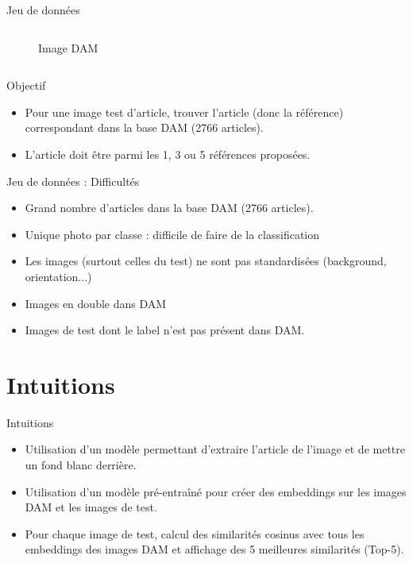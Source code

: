 \documentclass{beamer}
\begin{document}
\begin{frame}{Jeu de données}
\begin{columns}
\begin{figure}
        \caption{Image DAM}
    \end{figure}
\end{columns}
\vspace{0.5cm}
\begin{block}{Objectif}
\begin{itemize}
    \item Pour une image test d'article, trouver l'article (donc la référence) correspondant dans la base DAM (2766 articles).
    \item L'article doit être parmi les 1, 3 ou 5 références proposées.
\end{itemize}
\end{block}
\end{frame}

\begin{frame}{Jeu de données : Difficultés}
\begin{itemize}
    \item Grand nombre d'articles dans la base DAM (2766 articles).
    \item Unique photo par classe : difficile de faire de la classification
    \item Les images (surtout celles du test) ne sont pas standardisées (background, orientation...)
    \item Images en double dans DAM
    \item Images de test dont le label n'est pas présent dans DAM.
\end{itemize}
\end{frame}


\section{Intuitions}
\begin{frame}{Intuitions}
\begin{itemize}
    \item Utilisation d'un modèle permettant d'extraire l'article de l'image et de mettre un fond blanc derrière.
    \item Utilisation d'un modèle pré-entraîné pour créer des embeddings sur les images DAM et les images de test.
    \item Pour chaque image de test, calcul des similarités cosinus avec tous les embeddings des images DAM et affichage des 5 meilleures similarités (Top-5).
\end{itemize}
\end{frame}
\end{document}
